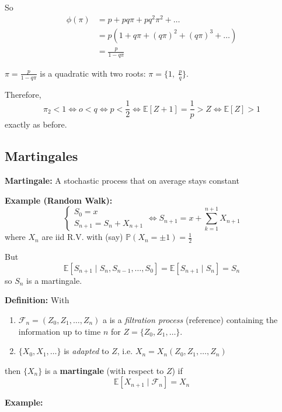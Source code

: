 \documentclass[12pt]{report}
\newcommand{\F}{\mathcal{F}}
\renewcommand{\P}{\mathbb{P}}
\newcommand{\E}{\mathbb{E}}
\begin{document}
    So 
    \begin{align*}
        \phi(\pi) &= p + pq\pi + pq^2\pi^2 + \dots\\ 
            &= p\left(1 + q\pi + (q\pi)^2 + (q\pi)^3 + \dots\right)\\ 
            &= \frac{p}{1 - q\pi}
    \end{align*}
    
    $\pi = \frac{p}{1 - q\pi}$ is a quadratic with two roots: $\pi = \{1, \; \frac{p}{q}\}$. 

    Therefore, 
    \[\pi_2 < 1 \iff o< q \iff p < \frac{1}{2} \iff \E[Z + 1] = \frac{1}{p} > Z \iff \E[Z] > 1\]
    exactly as before. 

\subsection*{Martingales}
    \textbf{Martingale:} A stochastic process that on average stays constant 

    \textbf{Example (Random Walk):} 
    \[\begin{cases}
        S_0 = x\\ 
        S_{n+1} = S_n + X_{n+1}
    \end{cases} \iff S_{n+1} = x + \sum_{k=1}^{n+1} X_{n+1} \]
    where $X_n$ are iid R.V. with (say) $\P(X_n = \pm 1) = \frac{1}{2}$ 

    But 
    \[\E[S_{n+1} \; | \; S_n, S_{n-1}, \dots, S_0] = \E[S_{n+1} \; | \; S_n] = S_n\]
    so $S_n$ is a martingale.

    \textbf{Definition:} With
    \begin{enumerate}
        \item $\F_n= (Z_0, Z_1, \dots, Z_n)$ a is a \emph{filtration process} (reference) containing the information up to time $n$ for $Z = \{Z_0, Z_1, \dots\}$.
        \item $\{X_0, X_1, \dots\}$ is \emph{adapted} to $Z$, i.e. $X_n = X_n(Z_0, Z_1, \dots, Z_n)$
    \end{enumerate}
    then $\{X_n\}$ is a \textbf{martingale} (with respect to $Z$) if 
    \[\E[X_{n+1} \; | \; \F_n] = X_n\] 

    \textbf{Example:} 
\end{document}

